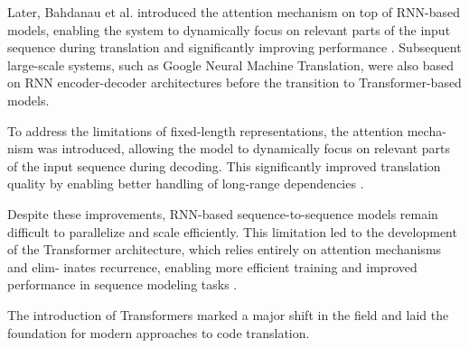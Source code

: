 Later, Bahdanau et al. introduced the attention mechanism on top of RNN-based
models, enabling the system to dynamically focus on relevant parts of the input
sequence during translation and significantly improving performance
\cite{bahdanau2015}. Subsequent large-scale systems, such as Google Neural
Machine Translation, were also based on RNN encoder-decoder architectures before
the transition to Transformer-based models.

To address the limitations of fixed-length representations, the attention mecha-
nism was introduced, allowing the model to dynamically focus on relevant parts
of the input sequence during decoding. This significantly improved translation
quality by enabling better handling of long-range dependencies
\cite{bahdanau2015}.

Despite these improvements, RNN-based sequence-to-sequence models remain difficult to
parallelize and scale efficiently. This limitation led to the development of the
Transformer architecture, which relies entirely on attention mechanisms and
elim- inates recurrence, enabling more efficient training and improved
performance in sequence modeling tasks \cite{vaswani2017}.

The introduction of Transformers marked a major shift in the field and laid the
foundation for modern approaches to code translation.